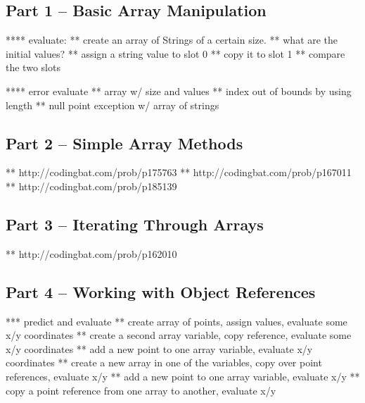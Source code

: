 \subsection{Part 1 -- Basic Array Manipulation}

**** evaluate:
** create an array of Strings of a certain size. 
** what are the initial values?
** assign a string value to slot 0
** copy it to slot 1
** compare the two slots

**** error evaluate
** array w/ size and values
** index out of bounds by using length
** null point exception w/ array of strings

\initialbox
\subsection{Part 2 -- Simple Array Methods}
** http://codingbat.com/prob/p175763
** http://codingbat.com/prob/p167011
** http://codingbat.com/prob/p185139

\initialbox
\subsection{Part 3 -- Iterating Through Arrays}
** http://codingbat.com/prob/p162010

\initialbox
\subsection{Part 4 -- Working with Object References}
*** predict and evaluate
** create array of points, assign values, evaluate some x/y coordinates
** create a second array variable, copy reference, evaluate some x/y coordinates
** add a new point to one array variable, evaluate x/y coordinates
** create a new array in one of the variables, copy over point references, evaluate x/y
** add a new point to one array variable, evaluate x/y
** copy a point reference from one array to another, evaluate x/y
\initialbox
